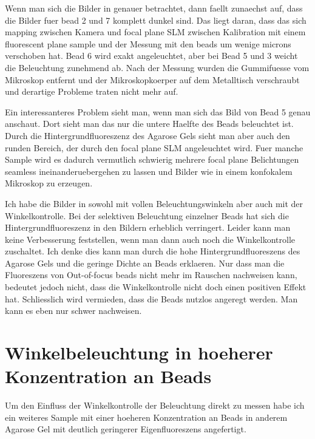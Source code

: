 Wenn  man sich die Bilder in
 genauer betrachtet, dann faellt zunaechst auf, dass
die Bilder fuer bead 2 und 7 komplett dunkel sind. Das liegt daran,
dass das sich mapping zwischen Kamera und focal plane SLM zwischen
Kalibration mit einem fluorescent plane sample und der Messung mit den
beads um wenige microns verschoben hat. Bead 6 wird exakt
angeleuchtet, aber bei Bead 5 und 3 weicht die Beleuchtung zunehmend
ab. Nach der Messung wurden die Gummifuesse vom Mikroskop entfernt und
der Mikroskopkoerper auf dem Metalltisch verschraubt und derartige
Probleme traten nicht mehr auf.

Ein  interessanteres Problem sieht man, wenn man sich
das Bild von Bead 5 genau anschaut. Dort sieht man das nur die untere
Haelfte des Beads beleuchtet ist. Durch die Hintergrundfluoreszenz des
Agarose Gels sieht man aber auch den runden Bereich, der durch den
focal plane SLM angeleuchtet wird. Fuer manche Sample wird es dadurch
vermutlich schwierig mehrere focal plane Belichtungen seamless
ineinanderuebergehen zu lassen und Bilder wie in einem konfokalem
Mikroskop zu erzeugen.

Ich  habe die
Bilder in  sowohl mit vollen Beleuchtungswinkeln
aber auch mit der Winkelkontrolle.  Bei der selektiven Beleuchtung
einzelner Beads hat sich die Hintergrundfluoreszenz in den Bildern
erheblich verringert. Leider kann man keine Verbesserung feststellen,
wenn man dann auch noch die Winkelkontrolle zuschaltet. Ich denke dies
kann man durch die hohe Hintergrundfluoreszens des Agarose Gels und
die geringe Dichte an Beads erklaeren. Nur dass man die Fluoreszens
von Out-of-focus beads nicht mehr im Rauschen nachweisen kann,
bedeutet jedoch nicht, dass die Winkelkontrolle nicht doch einen
positiven Effekt hat. Schliesslich wird vermieden, dass die Beads
nutzlos angeregt werden. Man kann es eben nur schwer nachweisen.

\section{Winkelbeleuchtung in hoeherer Konzentration an Beads}

Um den Einfluss der Winkelkontrolle der Beleuchtung direkt zu messen
habe ich ein weiteres Sample mit einer hoeheren Konzentration an Beads
in anderem Agarose Gel mit deutlich geringerer Eigenfluoreszens
angefertigt.

\begin{figure}[!hbt]
  \centering
  \caption{}
  \label{fig:montage-ang}
\end{figure}



